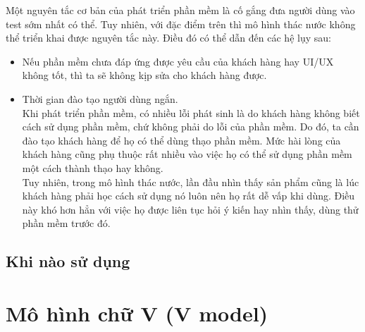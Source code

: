 \documentclass[14pt]{extarticle}
\begin{document}
Một nguyên tắc cơ bản của phát triển phần mềm là cố gắng đưa người dùng vào
test sớm nhất có thể. Tuy nhiên, với đặc điểm trên thì mô hình thác nước
không thể triển khai được nguyên tắc này. Điều đó có thể dẫn đến các
hệ lụy sau:
\begin{itemize}
  \item Nếu phần mềm chưa đáp ứng được yêu cầu của khách hàng hay
        UI/UX không tốt, thì ta sẽ không kịp sửa cho khách hàng được.
  \item Thời gian đào tạo người dùng ngắn.\\
        Khi phát triển phần mềm, có nhiều lỗi phát sinh là do khách hàng
        không biết cách sử dụng phần mềm, chứ không phải do lỗi của phần mềm.
        Do đó, ta cần đào tạo khách hàng để họ có thể dùng thạo phần mềm.
        Mức hài lòng của khách hàng cũng phụ thuộc rất nhiều vào việc họ
        có thể sử dụng phần mềm một cách thành thạo hay không.\\
        Tuy nhiên, trong mô hình thác nước, lần đầu nhìn thấy sản phẩm cũng
        là lúc khách hàng phải học cách sử dụng nó luôn nên họ rất dễ vấp
        khi dùng. Điều này khó hơn hẳn với việc họ được liên tục hỏi ý kiến
        hay nhìn thấy, dùng thử phần mềm trước đó.
\end{itemize}

\subsection{Khi nào sử dụng}

\newpage
\section{Mô hình chữ V (V model)}
\end{document}
